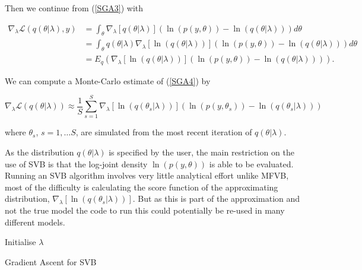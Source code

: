 \documentclass{article}\usepackage[]{graphicx}\usepackage[]{color}
\numberwithin{equation}{section}
\begin{document}
Then we continue from (\ref{SGA3}) with 

\begin{align}
\nabla_{\lambda} \mathcal{L}(q(\theta | \lambda), y) &=  \int_{\theta} \nabla_{\lambda} [q(\theta | \lambda)] \left( \ln (p(y, \theta)) - \ln(q(\theta | \lambda)) \right) d\theta \nonumber \\
&=   \int_{\theta} q(\theta | \lambda)  \nabla_{\lambda} [\ln(q(\theta | \lambda))]\left( \ln (p(y, \theta)) - \ln(q(\theta | \lambda)) \right)d\theta \nonumber \\
&= E_q \left(  \nabla_{\lambda} [\ln(q(\theta | \lambda))]\left( \ln (p(y, \theta)) - \ln(q(\theta | \lambda)) \right) \right). \label{SGA4}
\end{align}

We can compute a Monte-Carlo estimate of (\ref{SGA4}) by 

\begin{equation}
\label{SGA5}
\nabla_{\lambda}\mathcal{L}(q(\theta | \lambda)) \approx \frac{1}{S}\sum_{s=1}^{S} \nabla_{\lambda} [\ln(q(\theta_s | \lambda))] (\ln (p(y, \theta_s)) - \ln(q(\theta_s | \lambda)))
\end{equation}

where $\theta_s$, $s = 1, \dots S$, are simulated from the most recent iteration of  $q(\theta | \lambda)$.

As the distribution $q(\theta | \lambda)$ is specified by the user, the main restriction on the use of SVB is that the log-joint density $\ln(p(y, \theta))$ is able to be evaluated. Running an SVB algorithm involves very little analytical effort unlike MFVB, most of the difficulty is calculating the score function of the approximating distribution,
$\nabla_{\lambda} [\ln(q(\theta_s | \lambda))]$. But as this is part of the approximation and not the true model the code to run this could potentially be re-used in many different models. 

\begin{algorithm}[H]
 Initialise $\lambda$\;
 \caption{Gradient Ascent for SVB}
  \label{alg:algorithm2}
\end{algorithm}
\end{document}
